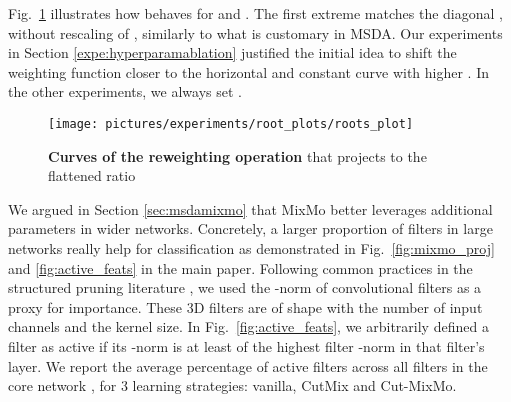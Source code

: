 \documentclass[10pt,twocolumn,letterpaper]{article}
\begin{document}
Fig.~\ref{fig:wr_plots} illustrates how  behaves for 
and . The first extreme  matches the diagonal
, without rescaling of , similarly to what is customary in MSDA.
Our experiments in Section \ref{expe:hyperparamablation} justified the initial idea to shift the weighting function closer to the
horizontal and constant curve  with higher .
In the other experiments, we always set .
\begin{figure}[!h]\centering \texttt{[image: pictures/experiments/root\_plots/roots\_plot]}\caption{\textbf{Curves of the reweighting operation} that projects  to the flattened ratio }\label{fig:wr_plots}\end{figure}%
We argued in Section \ref{sec:msdamixmo} that MixMo better leverages additional parameters in wider networks.
Concretely, a larger proportion of filters in large
networks really help for classification as demonstrated in
Fig.~\ref{fig:mixmo_proj} and \ref{fig:active_feats} in the main paper.
Following common practices in the structured pruning literature
\cite{li2017pruning}, we used the -norm of convolutional filters as a proxy
for importance. These 3D filters are of shape  with
 the number of input channels and  the kernel size. In
Fig.~\ref{fig:active_feats}, we arbitrarily defined a filter as active if its
-norm is at least  of the highest filter -norm in that
filter's layer. We report the average percentage of active filters across all filters in the core network , for 3 learning strategies: vanilla, CutMix and Cut-MixMo.
\end{document}
